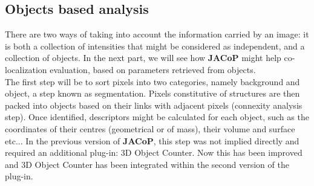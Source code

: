 \documentclass[]{spie}  %
\begin{document}
\subsection{Objects based analysis}
\label{sec:MM_OB}
There are two ways of taking into account the information carried by an image: it is both a collection of intensities that might be considered as independent, and a collection of objects. In the next part, we will see how \textbf{JACoP} might help co-localization evaluation, based on parameters retrieved from objects.\\
The first step will be to sort pixels into two categories, namely background and object, a step known as segmentation. Pixels constitutive of structures are then packed into objects based on their links with adjacent pixels (connexity analysis step). Once identified, descriptors might be calculated for each object, such as the coordinates of their centres (geometrical or of mass), their volume and surface etc... In the previous version of \textbf{JACoP}, this step was not implied directly and required an additional plug-in: 3D Object Counter. Now this has been improved and 3D Object Counter has been integrated within the second version of the plug-in.\\
\end{document}
